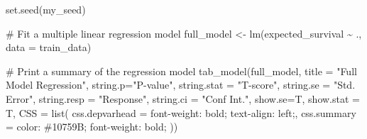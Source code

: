 \documentclass[
  letterpaper,
  DIV=11,
  numbers=noendperiod]{scrreprt}
\newenvironment{Shaded}{\begin{snugshade}}{\end{snugshade}}
\newcommand{\AttributeTok}[1]{\textcolor[rgb]{0.40,0.45,0.13}{#1}}
\newcommand{\CommentTok}[1]{\textcolor[rgb]{0.37,0.37,0.37}{#1}}
\newcommand{\FunctionTok}[1]{\textcolor[rgb]{0.28,0.35,0.67}{#1}}
\newcommand{\NormalTok}[1]{\textcolor[rgb]{0.00,0.23,0.31}{#1}}
\newcommand{\OtherTok}[1]{\textcolor[rgb]{0.00,0.23,0.31}{#1}}
\newcommand{\SpecialCharTok}[1]{\textcolor[rgb]{0.37,0.37,0.37}{#1}}
\newcommand{\StringTok}[1]{\textcolor[rgb]{0.13,0.47,0.30}{#1}}
\begin{document}
\begin{Shaded}
\begin{Highlighting}[]
\FunctionTok{set.seed}\NormalTok{(my\_seed)}

\CommentTok{\# Fit a multiple linear regression model}
\NormalTok{full\_model }\OtherTok{\textless{}{-}} \FunctionTok{lm}\NormalTok{(expected\_survival }\SpecialCharTok{\textasciitilde{}}\NormalTok{ ., }\AttributeTok{data =}\NormalTok{ train\_data)}

\CommentTok{\# Print a summary of the regression model}
\FunctionTok{tab\_model}\NormalTok{(full\_model, }\AttributeTok{title =} \StringTok{"Full Model Regression"}\NormalTok{, }
          \AttributeTok{string.p=}\StringTok{"P{-}value"}\NormalTok{, }\AttributeTok{string.stat =} \StringTok{"T{-}score"}\NormalTok{,}
          \AttributeTok{string.se =} \StringTok{"Std. Error"}\NormalTok{,}
          \AttributeTok{string.resp =} \StringTok{"Response"}\NormalTok{,}
          \AttributeTok{string.ci =} \StringTok{"Conf Int."}\NormalTok{,}
          \AttributeTok{show.se=}\NormalTok{T, }\AttributeTok{show.stat =}\NormalTok{ T,}
           \AttributeTok{CSS =} \FunctionTok{list}\NormalTok{(}
             \AttributeTok{css.depvarhead =} \StringTok{\textquotesingle{}font{-}weight: bold; text{-}align: left;\textquotesingle{}}\NormalTok{,}
             \AttributeTok{css.summary =} \StringTok{\textquotesingle{}color: \#10759B; font{-}weight: bold;\textquotesingle{}}
\NormalTok{           ))}
\end{Highlighting}
\end{Shaded}
\end{document}
